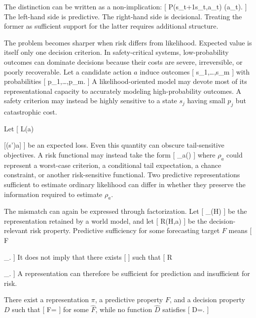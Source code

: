 \documentclass[11pt]{article}
\begin{document}
The distinction can be written as a non-implication:
[
P(s_{t+1}\mid s_t,a_t)
\quad\not\Rightarrow\quad
{}(a_t).
]
The left-hand side is predictive. The right-hand side is decisional. Treating the former as sufficient support for the latter requires additional structure.

The problem becomes sharper when risk differs from likelihood. Expected value is itself only one decision criterion. In safety-critical systems, low-probability outcomes can dominate decisions because their costs are severe, irreversible, or poorly recoverable. Let a candidate action $a$ induce outcomes
[
s_1,\ldots,s_m
]
with probabilities
[
p_1,\ldots,p_m.
]
A likelihood-oriented model may devote most of its representational capacity to accurately modeling high-probability outcomes. A safety criterion may instead be highly sensitive to a state $s_j$ having small $p_j$ but catastrophic cost.

Let
[
L(a)

[\ell(s')\mid a]
]
be an expected loss. Even this quantity can obscure tail-sensitive objectives. A risk functional may instead take the form
[
\rho_a(\ell)
]
where $\rho_a$ could represent a worst-case criterion, a conditional tail expectation, a chance constraint, or another risk-sensitive functional. Two predictive representations sufficient to estimate ordinary likelihood can differ in whether they preserve the information required to estimate $\rho_a$.

The mismatch can again be expressed through factorization. Let
[
\pi_{}(H)
]
be the representation retained by a world model, and let
[
R(H,a)
]
be the decision-relevant risk property. Predictive sufficiency for some forecasting target $F$ means
[
F

\circ\pi_{}.
]
It does not imply that there exists
[
]
such that
[
R

\circ\pi_{}.
]
A representation can therefore be sufficient for prediction and insufficient for risk.

\begin{proposition}
There exist a representation $\pi$, a predictive property $F$, and a decision property $D$ such that
[
F=\circ\pi
]
for some $\widehat{F}$, while no function $\widehat{D}$ satisfies
[
D=\circ\pi.
]
\end{proposition}
\end{document}
